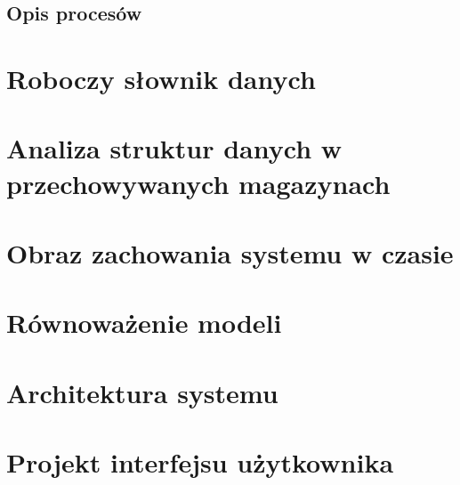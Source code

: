 \documentclass[paper=a4, fontsize=12pt]{scrartcl}
\numberwithin{equation}{section}		%
\numberwithin{figure}{section}			%
\numberwithin{table}{section}				%
\begin{document}
	\subsection{Opis procesów}
		

\section{Roboczy słownik danych}
	
	
\section{Analiza struktur danych w przechowywanych magazynach}
	

\section{Obraz zachowania systemu w czasie}
	
	
\section{Równoważenie modeli}
	

\section{Architektura systemu}
	

\section{Projekt interfejsu użytkownika}
	

\end{document}
